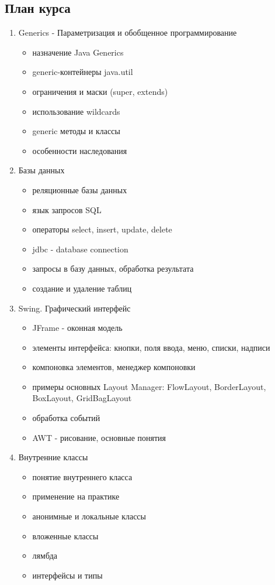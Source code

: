\documentclass[a4paper,12pt]{article}
\begin{document}
\subsection*{План курса}
\begin{enumerate}
\item Generics - Параметризация и обобщенное программирование
    \begin{itemize}
        \item назначение Java Generics
        \item generic-контейнеры java.util
        \item ограничения и маски (super, extends)
        \item использование wildcards
        \item generic методы и классы
        \item особенности наследования
    \end{itemize}
    
\item Базы данных
    \begin{itemize}
        \item реляционные базы данных
        \item язык запросов SQL
        \item операторы select, insert, update, delete
        \item jdbc - database connection
        \item запросы в базу данных, обработка результата
        \item создание и удаление таблиц
    \end{itemize}
    
\item Swing. Графический интерфейс
    \begin{itemize}
        \item JFrame - оконная модель
        \item элементы интерфейса: кнопки, поля ввода, меню, списки, надписи
        \item компоновка элементов, менеджер компоновки
        \item примеры основных Layout Manager: FlowLayout, BorderLayout, BoxLayout, GridBagLayout
        \item обработка событий
        \item AWT - рисование, основные понятия
    \end{itemize}

\item Внутренние классы
    \begin{itemize}
        \item понятие внутреннего класса
        \item применение на практике
        \item анонимные и локальные классы
        \item вложенные классы
        \item лямбда
        \item интерфейсы и типы
    \end{itemize}


\end{enumerate}
\end{document}
